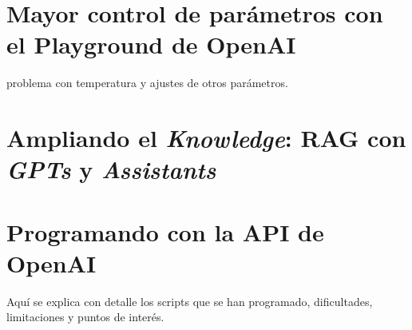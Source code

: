 \section{Mayor control de parámetros con el Playground de OpenAI}

problema con temperatura y ajustes de otros parámetros.

\section{Ampliando el \textit{Knowledge}: RAG con \textit{GPTs} y \textit{Assistants}}

\section{Programando con la API de OpenAI}
Aquí se explica con detalle los scripts que se han programado, dificultades, limitaciones y puntos de interés.






